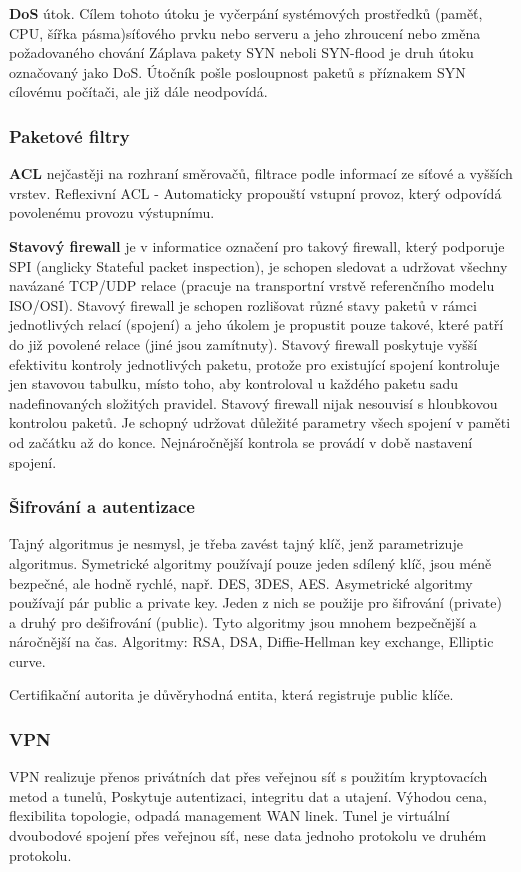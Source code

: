 \textbf{DoS} útok. Cílem tohoto útoku je vyčerpání systémových prostředků (paměť, CPU, šířka pásma)síťového prvku nebo serveru a jeho zhroucení nebo změna požadovaného chování 
Záplava pakety SYN neboli SYN-flood je druh útoku označovaný jako DoS. Útočník pošle posloupnost paketů s příznakem SYN cílovému počítači, ale již dále neodpovídá.

\subsubsection{Paketové filtry}
\textbf{ACL} nejčastěji na rozhraní směrovačů, filtrace podle informací ze síťové a vyšších vrstev. Reflexivní ACL - Automaticky propouští vstupní provoz, který odpovídá povolenému provozu výstupnímu.

\textbf{Stavový firewall} je v informatice označení pro takový firewall, který podporuje SPI (anglicky Stateful packet inspection), je schopen sledovat a udržovat všechny navázané TCP/UDP relace (pracuje na transportní vrstvě referenčního modelu ISO/OSI). Stavový firewall je schopen rozlišovat různé stavy paketů v rámci jednotlivých relací (spojení) a jeho úkolem je propustit pouze takové, které patří do již povolené relace (jiné jsou zamítnuty).
Stavový firewall poskytuje vyšší efektivitu kontroly jednotlivých paketu, protože pro existující spojení kontroluje jen stavovou tabulku, místo toho, aby kontroloval u každého paketu sadu nadefinovaných složitých pravidel. Stavový firewall nijak nesouvisí s hloubkovou kontrolou paketů. Je schopný udržovat důležité parametry všech spojení v paměti od začátku až do konce. Nejnáročnější kontrola se provádí v době nastavení spojení.

 
\subsubsection{Šifrování a autentizace}
Tajný algoritmus je nesmysl, je třeba zavést tajný klíč, jenž parametrizuje algoritmus. Symetrické algoritmy používají pouze jeden sdílený klíč, jsou méně bezpečné, ale hodně rychlé, např. DES, 3DES, AES. Asymetrické algoritmy používají pár public a private key. Jeden z nich se použije pro šifrování (private) a druhý pro dešifrování (public). Tyto algoritmy jsou mnohem bezpečnější a náročnější na čas. Algoritmy: RSA, DSA, Diffie-Hellman key exchange, Elliptic curve.

Certifikační autorita je důvěryhodná entita, která registruje public klíče.

\subsubsection{VPN}
VPN realizuje přenos privátních dat přes veřejnou síť s použitím kryptovacích metod a tunelů, Poskytuje autentizaci, integritu dat a utajení. Výhodou cena, flexibilita topologie, odpadá management WAN linek. Tunel je virtuální dvoubodové spojení přes veřejnou síť, nese data jednoho protokolu ve druhém protokolu.

